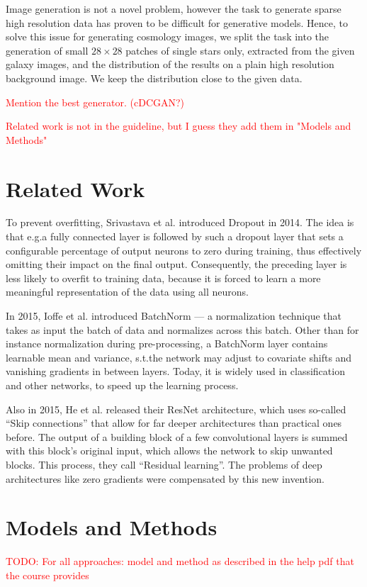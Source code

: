 \documentclass[10pt,conference,compsocconf]{IEEEtran}
\newcommand\TODO[1]{\textcolor{red}{#1}} %
\begin{document}
Image generation is not a novel problem, however the task to generate sparse high resolution data has proven to be difficult for generative models. Hence, to solve this issue for generating cosmology images, we split the task into the generation of small $28\times28$ patches of single stars only, extracted from the given galaxy images, and the distribution of the results on a plain high resolution background image. We keep the distribution close to the given data.

\TODO{Mention the best generator. (cDCGAN?)}

\TODO{Related work is not in the guideline, but I guess they add them in "Models and Methods"}
\section{Related Work}
To prevent overfitting, Srivastava et al.\@ \cite{Dropout} introduced Dropout in 2014. The idea is that e.g.\@ a fully connected layer is followed by such a dropout layer that sets a configurable percentage of output neurons to zero during training, thus effectively omitting their impact on the final output. Consequently, the preceding layer is less likely to overfit to training data, because it is forced to learn a more meaningful representation of the data using all neurons.

In 2015, Ioffe et al.\@ \cite{BatchNorm} introduced BatchNorm --- a normalization technique that takes as input the batch of data and normalizes across this batch. Other than for instance normalization during pre-processing, a BatchNorm layer contains learnable mean and variance, s.t.\@ the network may adjust to covariate shifts and vanishing gradients in between layers. Today, it is widely used in classification and other networks, to speed up the learning process.

Also in 2015, He et al.\@ \cite{ResNet} released their ResNet architecture, which uses so-called ``Skip connections'' that allow for far deeper architectures than practical ones before. The output of a building block of a few convolutional layers is summed with this block's original input, which allows the network to skip unwanted blocks. This process, they call ``Residual learning''. The problems of deep architectures like zero gradients were compensated by this new invention.

\section{Models and Methods}
\TODO{TODO: For all approaches: model and method as described in the help pdf that the course provides}
\end{document}
